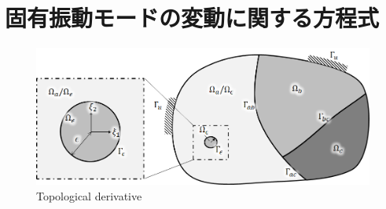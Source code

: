 \section{固有振動モードの変動に関する方程式}

\begin{figure}[ht]
	\begin{center}
		\includegraphics[width=13cm]{./figures/TD.png}
		\caption{Topological derivative}
		\label{fig:TD}
	\end{center}
\end{figure}

